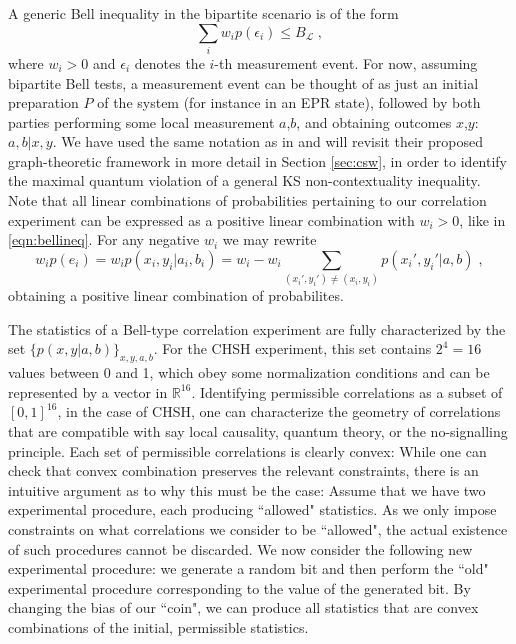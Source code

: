 A generic Bell inequality in the bipartite scenario is of the form
\begin{equation}
\sum_i w_i p(\epsilon_i)\leq B_\mathcal{L}\;,
\label{eqn:bellineq}
\end{equation}
where $w_i>0$ and $\epsilon_i$ denotes the $i$-th measurement event. For now, assuming bipartite Bell tests, a measurement event can be thought of as just an initial preparation $P$ of the system (for instance in an EPR state), followed by both parties performing some local measurement $a$,$b$, and obtaining outcomes $x$,$y$: $a,b \vert x,y$. We have used the same notation as in \cite{Cabello2014} and will revisit their proposed graph-theoretic framework in more detail in Section \ref{sec:csw}, in order to identify the maximal quantum violation of a general KS non-contextuality inequality. Note that all linear combinations of probabilities pertaining to our correlation experiment can be expressed as a positive linear combination with $w_i>0$, like in \ref{eqn:bellineq}. For any negative $w_i$ we may rewrite 
\begin{equation*}
w_i p(e_i)=w_i p(x_i,y_i\vert a_i,b_i)=w_i-w_i\sum\limits_{(x_i',y_i')\neq(x_i,y_i)} p(x_i',y_i' \vert a,b)\;,
\end{equation*} obtaining a positive linear combination of probabilites. 

The statistics of a Bell-type correlation experiment are fully characterized by the set $\{p(x,y\vert a,b)\}_{x,y,a,b}$. For the CHSH experiment, this set contains $2^4=16$ values between 0 and 1, which obey some normalization conditions and can be represented by a vector in $\mathbb{R}^{16}$. Identifying permissible correlations as a subset of $[0,1]^{16}$, in the case of CHSH, one can characterize the geometry of correlations that are compatible with say local causality, quantum theory, or the no-signalling principle. Each set of permissible correlations is clearly convex: While one can check that convex combination preserves the relevant constraints, there is an intuitive argument as to why this must be the case: Assume that we have two experimental procedure, each producing ``allowed" statistics. As we only impose constraints on what correlations we consider to be ``allowed", the actual existence of such procedures cannot be discarded. We now consider the following new experimental procedure: we generate a random bit and then perform the ``old" experimental procedure corresponding to the value of the generated bit. By changing the bias of our ``coin", we can produce all statistics that are convex combinations of the initial, permissible statistics.

